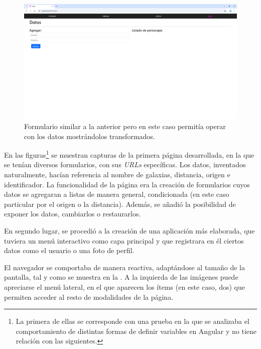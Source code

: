 \begin{figure}[H]
    \centering
    \includegraphics[width=0.8\linewidth]{figuras/pag4.png}
    \caption[Formulario web: Página 4]{Formulario similar a la anterior pero en este caso permitía operar con los datos mostrándolos transformados.}
    \label{pag4}
\end{figure}

En las figuras\footnote{La primera de ellas se corresponde con una prueba en la que se analizaba el comportamiento de distintas formas de definir variables en Angular y no tiene relación con las siguientes.} se muestran capturas de la primera página desarrollada, en la que se tenían diversos formularios, con sus \textit{URLs} específicas. Los datos, inventados naturalmente, hacían referencia al nombre de galaxias, distancia, origen e identificador. La funcionalidad de la página era la creación de formularios cuyos datos se agregaran a listas de manera general, condicionada (en este caso particular por el origen o la distancia). Además, se añadió la posibilidad de exponer los datos, cambiarlos o restaurarlos.

En segundo lugar, se procedió a la creación de una aplicación más elaborada, que tuviera un menú interactivo como capa principal y que registrara en él ciertos datos como el usuario o una foto de perfil.

El navegador se comportaba de manera reactiva, adaptándose al tamaño de la pantalla, tal y como se muestra en la . A la izquierda de las imágenes puede apreciarse el menú lateral, en el que aparecen los ítems (en este caso, dos) que permiten acceder al resto de modalidades de la página.

